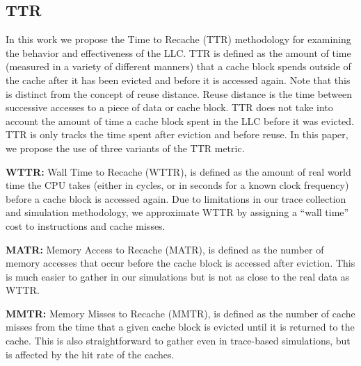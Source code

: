 %

\subsection{TTR}
\label{sec:metrics}
In this work we propose the Time to Recache (TTR) methodology for
examining the behavior and effectiveness of the LLC.  TTR is defined
as the amount of time (measured in a variety of different manners)
that a cache block spends outside of the cache after it has been
evicted and before it is accessed again.  
Note that this is distinct from the concept of reuse distance.  
Reuse distance is the time between successive accesses to a piece of
data or cache block.  
TTR does not take into account the amount of time a cache block spent
in the LLC before it was evicted.  
TTR is only tracks the time spent after eviction and before reuse.
In this paper, we propose the use of three variants of the TTR
metric. 

\textbf{WTTR:} Wall Time to Recache (WTTR), is defined as the amount
of real world time the CPU takes (either in cycles, or in seconds for
a known clock frequency) before a cache block is accessed again.
Due to limitations in our trace collection and simulation methodology,
we approximate WTTR by assigning a ``wall time'' cost to instructions
and cache misses.

\textbf{MATR:} Memory Access to Recache (MATR), is defined as the
number of memory accesses that occur before the cache block is
accessed after eviction.
This is much easier to gather in our simulations but is not as close
to the real data as WTTR.

\textbf{MMTR:} Memory Misses to Recache (MMTR), is defined as the
number of cache misses from the time that a given cache block is
evicted until it is returned to the cache.
This is also straightforward to gather even in trace-based
simulations, but is affected by the hit rate of the caches.

